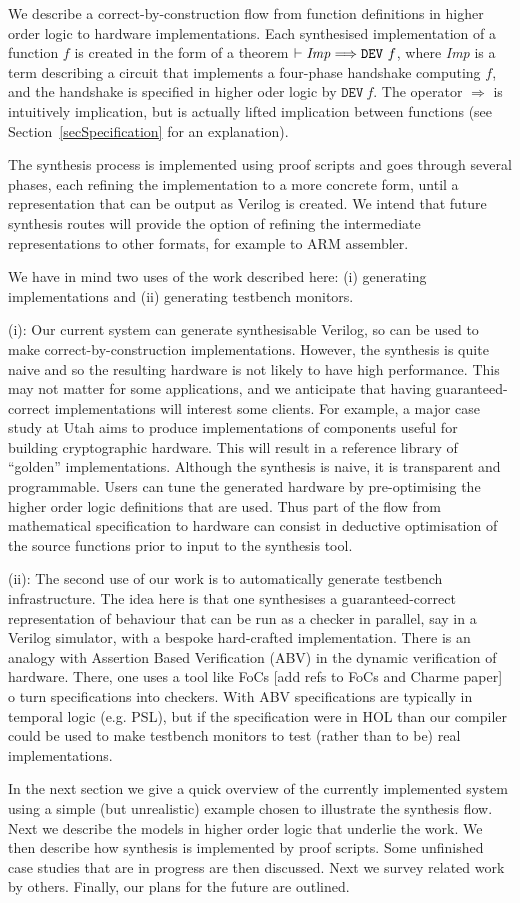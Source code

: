 
We describe a correct-by-construction flow from function definitions
in higher order logic to hardware implementations.  Each synthesised
implementation of a function $f$ is created in the form of a theorem
$\vdash {\it{Imp}}\Longrightarrow\texttt{DEV}~f$, where {\it{Imp}} is
a term describing a circuit that implements a four-phase handshake
computing $f$, and the handshake is specified in higher oder logic by
$\texttt{DEV}~f$. The operator $\Longrightarrow$ is intuitively
implication, but is actually lifted implication between functions (see
Section~\ref{secSpecification} for an explanation).

The synthesis process is implemented using proof
scripts and goes through several phases, each refining the
implementation to a more concrete form, until a representation that
can be output as Verilog is created. We intend that future synthesis
routes will provide the option of refining the intermediate
representations to other formats, for example to ARM assembler.

We have in mind two uses of the work described here: (i) generating
implementations and (ii) generating testbench monitors.

(i): Our current system can generate synthesisable Verilog, so can be
used to make correct-by-construction implementations. However, the
synthesis is quite naive and so the resulting hardware is not likely
to have high performance. This may not matter for some applications,
and we anticipate that having guaranteed-correct implementations will
interest some clients. For example, a major case study at Utah aims to
produce implementations of components useful for building
cryptographic hardware.  This will result in a reference library of ``golden''
implementations. Although the synthesis is naive, it is transparent
and programmable. Users can tune the generated hardware by
pre-optimising the higher order logic definitions that are used. Thus
part of the flow from mathematical specification to hardware can
consist in deductive optimisation of the source functions prior to
input to the synthesis tool.

(ii): The second use of our work is to automatically generate testbench
infrastructure. The idea here is that one synthesises a
guaranteed-correct representation of behaviour that can be run as a checker in
parallel, say in a Verilog simulator, with a bespoke hard-crafted
implementation. There is an analogy with
Assertion Based Verification (ABV) in the dynamic verification of
hardware. There, one uses a tool like FoCs [add refs to FoCs and Charme paper] 
o turn specifications into checkers.  With ABV specifications
are typically in temporal logic (e.g.{} PSL), but if the specification
were in HOL than our compiler could be used to make
testbench monitors to test (rather than to be) real implementations.

In the next section we give a quick overview of the currently
implemented system using a simple (but unrealistic) example chosen to
illustrate the synthesis flow.  Next we describe the models in higher
order logic that underlie the work. We then describe how synthesis is
implemented by proof scripts. Some unfinished case studies that are in
progress are then discussed. Next we survey related work by
others. Finally, our plans for the future are outlined.
